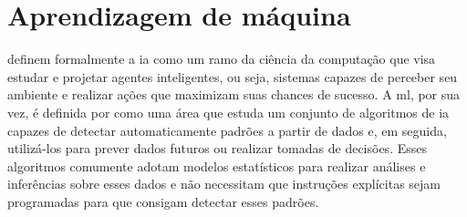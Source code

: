 \section{Aprendizagem de máquina}
\label{sec:am}




 definem formalmente a \acrfull{ia} como um ramo da ciência da computação que visa estudar e projetar agentes inteligentes, ou seja, sistemas capazes de perceber seu ambiente e realizar ações que maximizam suas chances de sucesso.
A \acrfull{ml}, por sua vez, é definida por  como uma área que estuda um conjunto de algoritmos de \acrshort{ia} capazes de detectar automaticamente padrões a partir de dados e, em seguida, utilizá-los para prever dados futuros ou realizar tomadas de decisões.
Esses algoritmos comumente adotam modelos estatísticos para realizar análises e inferências sobre esses dados e não necessitam que instruções explícitas sejam programadas para que consigam detectar esses padrões.






